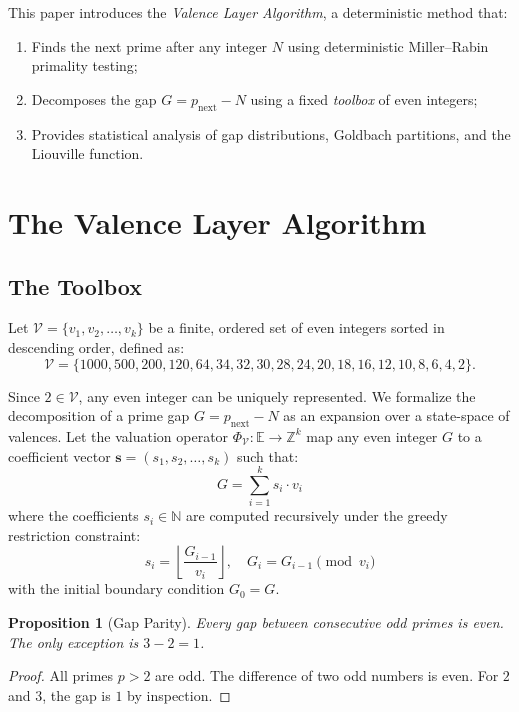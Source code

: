 \documentclass[12pt,a4paper]{article}
\theoremstyle{plain}
\newtheorem{proposition}[theorem]{Proposition}
\begin{document}
This paper introduces the {\it Valence Layer Algorithm}, a
deterministic method that:
\begin{enumerate}
  \item Finds the next prime after any integer $N$ using
    deterministic Miller--Rabin primality testing;
  \item Decomposes the gap $G=p_{\text{next}}-N$ using a fixed
    {\it toolbox} of even integers;
  \item Provides statistical analysis of gap distributions,
    Goldbach partitions, and the Liouville function.
\end{enumerate}

\section{The Valence Layer Algorithm}
\label{sec:alg}

\subsection{The Toolbox}
\label{sec:tools}

Let $\mathcal{V} = \{v_1, v_2, \dots, v_k\}$ be a finite, ordered set of
even integers sorted in descending order, defined as:
\[
\mathcal{V} = \{1000, 500, 200, 120, 64, 34, 32, 30, 28, 24,
20, 18, 16, 12, 10, 8, 6, 4, 2\}.
\]

Since $2 \in \mathcal{V}$, any even integer can be uniquely represented.
We formalize the decomposition of a prime gap $G = p_{\text{next}} - N$
as an expansion over a state-space of valences.  Let the valuation
operator $\Phi_{\mathcal{V}}: \mathbb{E} \to \mathbb{Z}^k$ map any even
integer $G$ to a coefficient vector $\mathbf{s} = (s_1, s_2, \dots, s_k)$
such that:
\[
G = \sum_{i=1}^{k} s_i \cdot v_i
\]
where the coefficients $s_i \in \mathbb{N}$ are computed recursively
under the greedy restriction constraint:
\[
s_i = \left\lfloor \frac{G_{i-1}}{v_i} \right\rfloor,\quad
G_i = G_{i-1} \pmod{v_i}
\]
with the initial boundary condition $G_0 = G$.

\begin{proposition}[Gap Parity]
\label{prop:parity}
Every gap between consecutive odd primes is even.
The only exception is $3-2=1$.
\end{proposition}
\begin{proof}
All primes $p>2$ are odd.  The difference of two odd numbers is even.
For $2$ and $3$, the gap is $1$ by inspection.
\end{proof}
\end{document}
